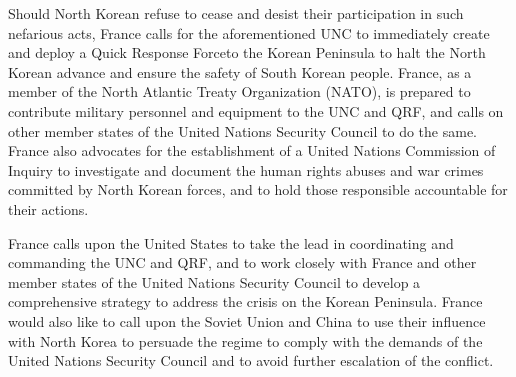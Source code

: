 \documentclass[a4paper,12pt]{article}
\begin{document}
Should North Korean refuse to cease and desist their participation in such nefarious acts, France calls for the aforementioned UNC to immediately create and deploy a Quick Response Force\footnotemark[1] to the Korean Peninsula to halt the North Korean advance and ensure the safety of South Korean people. France, as a member of the North Atlantic Treaty Organization (NATO), is prepared to contribute military personnel and equipment to the UNC and QRF, and calls on other member states of the United Nations Security Council to do the same. France also advocates for the establishment of a United Nations Commission of Inquiry to investigate and document the human rights abuses and war crimes committed by North Korean forces, and to hold those responsible accountable for their actions.

France calls upon the United States to take the lead in coordinating and commanding the UNC and QRF, and to work closely with France and other member states of the United Nations Security Council to develop a comprehensive strategy to address the crisis on the Korean Peninsula. France would also like to call upon the Soviet Union and China to use their influence with North Korea to persuade the regime to comply with the demands of the United Nations Security Council and to avoid further escalation of the conflict.

\newpage
\end{document}
